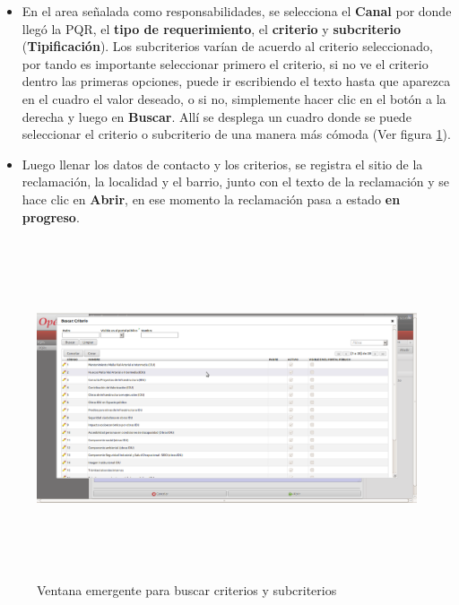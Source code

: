 \begin{itemize}
\begin{enumerate}
 \end{enumerate}
 \item En el area señalada como responsabilidades, se selecciona el \textbf{Canal} por donde llegó la PQR, el \textbf{tipo de requerimiento},
 el \textbf{criterio} y \textbf{subcriterio} (\textbf{Tipificación}). Los subcriterios varían de acuerdo al criterio seleccionado, por tando es importante seleccionar
 primero el criterio, si no ve el criterio dentro las primeras opciones, puede ir escribiendo el texto hasta que aparezca en el cuadro el valor deseado, o 
 si no, simplemente hacer clic en el botón a la derecha y luego en \textbf{Buscar}. Allí se desplega un cuadro donde se puede seleccionar
 el criterio o subcriterio de una manera más cómoda (Ver figura \ref{fig:buscarcriterios}).
 
 
 \item Luego llenar los datos de contacto y los criterios, 
 se registra el sitio de la reclamación, la localidad y el barrio, junto con
 el texto de la reclamación y se hace clic en \textbf{Abrir}, en ese momento la reclamación pasa a estado \textbf{en progreso}.
\end{itemize}

\begin{figure}
 \centering
 \includegraphics[width=17cm,height=10cm]{./Imagenes/buscarcriterios.png}
 \caption{Ventana emergente para buscar criterios y subcriterios}
 \label{fig:buscarcriterios}
\end{figure}



